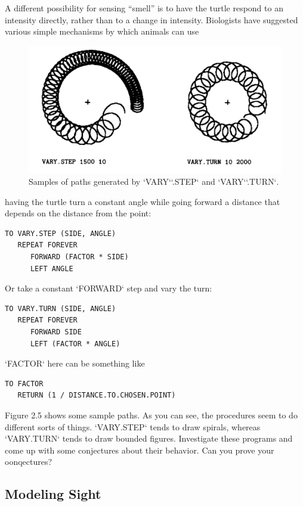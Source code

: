 \documentclass{book}
\begin{document}
A different possibility for sensing ``smell'' is to have the turtle respond
to an intensity directly, rather than to a change in intensity. Biologists
have suggested various simple mechanisms by which animals can use

\begin{figure}
\begin{center}
\includegraphics[scale=1]{fig2-5}
\caption{Samples of paths generated by \textsc{`VARY`}\textsc{`.STEP`} and \textsc{`VARY`}\textsc{`.TURN`}.}
\end{center}
\end{figure}

having the turtle turn a constant angle while going forward a distance
that depends on the distance from the point:

\begin{verbatim}
TO VARY.STEP (SIDE, ANGLE)
   REPEAT FOREVER
      FORWARD (FACTOR * SIDE)
      LEFT ANGLE
\end{verbatim}
Or take a constant \textsc{`FORWARD`} step and vary the turn:

\begin{verbatim}
TO VARY.TURN (SIDE, ANGLE)
   REPEAT FOREVER
      FORWARD SIDE
      LEFT (FACTOR * ANGLE)
\end{verbatim}
\textsc{`FACTOR`} here can be something like

\begin{verbatim}
TO FACTOR
   RETURN (1 / DISTANCE.TO.CHOSEN.POINT)
\end{verbatim}
Figure 2.5 shows some sample paths. As you can see, the procedures
seem to do different sorts of things. \textsc{`VARY.STEP`} tends to draw spirals,
whereas \textsc{`VARY.TURN`} tends to draw bounded figures. Investigate these
programs and come up with some conjectures about their behavior. Can
you prove your oonqectures?

\subsection{Modeling Sight}
\end{document}
